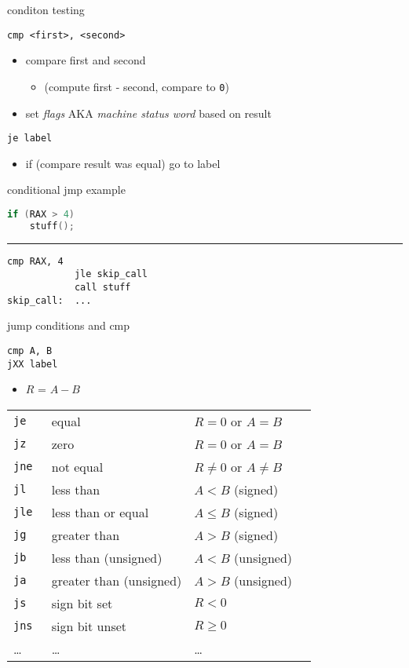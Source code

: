 \begin{frame}[fragile,label=condTest]{conditon testing}
\begin{lstlisting}
cmp <first>, <second>
\end{lstlisting}
\begin{itemize}
\item compare first and second
    \begin{itemize}
    \item (compute first - second, compare to \texttt{0})
    \end{itemize}
\item set \textit{flags} AKA \textit{machine status word} based on result
\end{itemize}
\begin{lstlisting}
je label
\end{lstlisting}
\begin{itemize}
\item if (compare result was equal) go to label
\end{itemize}
\end{frame}

\begin{frame}[fragile,label=condJmpEx]{conditional jmp example}
\begin{lstlisting}[language=C++]
if (RAX > 4)
    stuff();
\end{lstlisting}
\hrule
\begin{lstlisting}[language=myasm]
            cmp RAX, 4
            jle skip_call
            call stuff
skip_call:  ...
\end{lstlisting}
\end{frame}

\begin{frame}[fragile,label=jumpConditions]{jump conditions and cmp}
\begin{lstlisting}
cmp A, B
jXX label
\end{lstlisting}
\begin{itemize}\item $R$ = $A - B$\end{itemize}
\small
\begin{tabular}{llll}
\tt je & equal & $R = 0$ or $A = B$\\
\tt jz & zero & $R = 0$ or $A = B$\\
\tt jne & not equal & $R \not= 0$ or $A \not= B$\\
\tt jl & less than & $A < B$ (signed) \\
\tt jle & less than or equal & $A \le B$ (signed)\\
\tt jg & greater than & $A > B$ (signed) \\
\tt jb & less than (unsigned) & $A < B$ (unsigned)\\
\tt ja & greater than (unsigned) & $A > B$ (unsigned) \\
\tt js & sign bit set & $R < 0$ \\
\tt jns & sign bit unset & $R \ge 0$ \\
\ldots & \ldots & \ldots
\end{tabular}
\end{frame}

